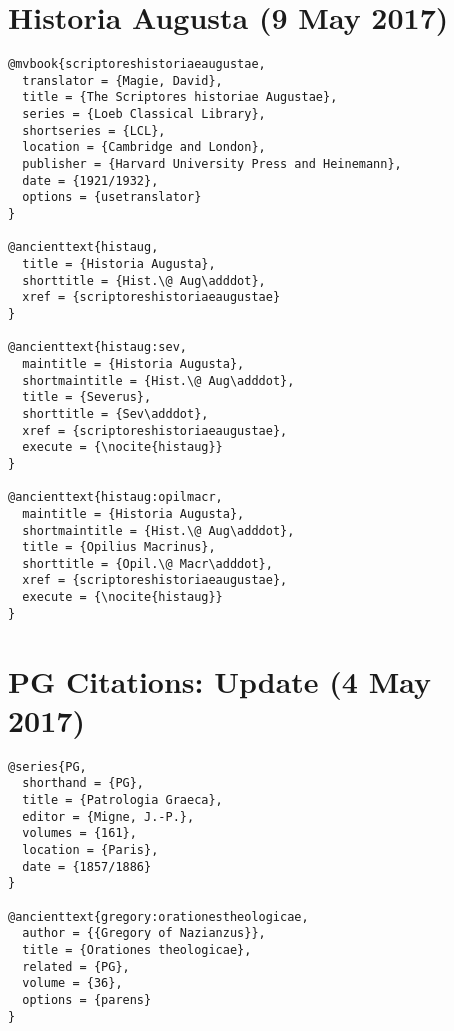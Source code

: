 \documentclass[a4paper]{article}
\begin{document}
\nocite{musoniusrufusfrag:abbrev}
\exampleancientsources
\examplesecondarysources
\examplebibliography
{}

\section{Historia Augusta (9 May 2017)}

\begin{verbatim}
@mvbook{scriptoreshistoriaeaugustae,
  translator = {Magie, David},
  title = {The Scriptores historiae Augustae},
  series = {Loeb Classical Library},
  shortseries = {LCL},
  location = {Cambridge and London},
  publisher = {Harvard University Press and Heinemann},
  date = {1921/1932},
  options = {usetranslator}
}

@ancienttext{histaug,
  title = {Historia Augusta},
  shorttitle = {Hist.\@ Aug\adddot},
  xref = {scriptoreshistoriaeaugustae}
}

@ancienttext{histaug:sev,
  maintitle = {Historia Augusta},
  shortmaintitle = {Hist.\@ Aug\adddot},
  title = {Severus},
  shorttitle = {Sev\adddot},
  xref = {scriptoreshistoriaeaugustae},
  execute = {\nocite{histaug}}
}

@ancienttext{histaug:opilmacr,
  maintitle = {Historia Augusta},
  shortmaintitle = {Hist.\@ Aug\adddot},
  title = {Opilius Macrinus},
  shorttitle = {Opil.\@ Macr\adddot},
  xref = {scriptoreshistoriaeaugustae},
  execute = {\nocite{histaug}}
}
\end{verbatim}

\nocite{histaug}
\exampleancientsources
\examplesecondarysources
\examplebibliography
{}

\section{PG Citations: Update (4 May 2017)}

\begin{verbatim}
@series{PG,
  shorthand = {PG},
  title = {Patrologia Graeca},
  editor = {Migne, J.-P.},
  volumes = {161},
  location = {Paris},
  date = {1857/1886}
}

@ancienttext{gregory:orationestheologicae,
  author = {{Gregory of Nazianzus}},
  title = {Orationes theologicae},
  related = {PG},
  volume = {36},
  options = {parens}
}
\end{verbatim}
\end{document}
